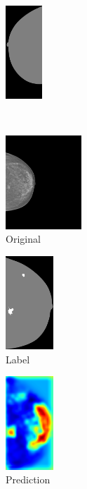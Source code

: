 \documentclass{beamer}
\begin{document}
\begin{frame}
\begin{figure}[h]
\begin{subfigure}{0.17\textwidth}
			\end{subfigure}
			\begin{subfigure}{0.22\textwidth}
				\centering
					\includegraphics[height=3.5cm]{plots/segmentation_ex1_v2.png}
			\end{subfigure}%
			\\
			\begin{subfigure}{0.25\textwidth}
				\centering
					\includegraphics[height = 3.5cm]{plots/mammogram_ex2.png}
				\caption{Original}
			\end{subfigure}
			\begin{subfigure}{0.16\textwidth}
				\centering
					\includegraphics[height = 3.5cm]{plots/label_ex2.png}
				\caption{Label}
			\end{subfigure}
			\begin{subfigure}{0.17\textwidth}
				\centering
					\includegraphics[height = 3.5cm]{plots/logits_ex2_v2.png}
				\caption{Prediction}
			\end{subfigure}
			\begin{subfigure}{0.22\textwidth}

\end{subfigure}
\end{figure}
\end{frame}
\end{document}

